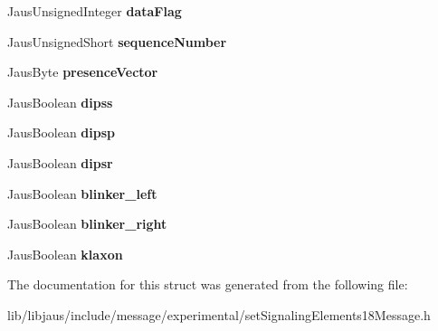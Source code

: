 \begin{DoxyCompactItemize}
\item 
\hypertarget{struct_set_signaling_elements18_message_struct_a64f7f558684c4d1894be82c2c8ef9be9}{\-Jaus\-Unsigned\-Integer {\bfseries data\-Flag}}\label{struct_set_signaling_elements18_message_struct_a64f7f558684c4d1894be82c2c8ef9be9}

\item 
\hypertarget{struct_set_signaling_elements18_message_struct_af2b609b366d6d6f5ca0ddd292bac9562}{\-Jaus\-Unsigned\-Short {\bfseries sequence\-Number}}\label{struct_set_signaling_elements18_message_struct_af2b609b366d6d6f5ca0ddd292bac9562}

\item 
\hypertarget{struct_set_signaling_elements18_message_struct_af1d24406f69c503790c1b650442d1dd6}{\-Jaus\-Byte {\bfseries presence\-Vector}}\label{struct_set_signaling_elements18_message_struct_af1d24406f69c503790c1b650442d1dd6}

\item 
\hypertarget{struct_set_signaling_elements18_message_struct_a379c20145c726a1412d9d187b7795714}{\-Jaus\-Boolean {\bfseries dipss}}\label{struct_set_signaling_elements18_message_struct_a379c20145c726a1412d9d187b7795714}

\item 
\hypertarget{struct_set_signaling_elements18_message_struct_aeb9d0eb5b73c14095748ceb5c5666f85}{\-Jaus\-Boolean {\bfseries dipsp}}\label{struct_set_signaling_elements18_message_struct_aeb9d0eb5b73c14095748ceb5c5666f85}

\item 
\hypertarget{struct_set_signaling_elements18_message_struct_aa7a2a0bbb2fc95c17983f4bbc91f3f6b}{\-Jaus\-Boolean {\bfseries dipsr}}\label{struct_set_signaling_elements18_message_struct_aa7a2a0bbb2fc95c17983f4bbc91f3f6b}

\item 
\hypertarget{struct_set_signaling_elements18_message_struct_a00214e806c9a2b9c520834dea7c606c7}{\-Jaus\-Boolean {\bfseries blinker\-\_\-left}}\label{struct_set_signaling_elements18_message_struct_a00214e806c9a2b9c520834dea7c606c7}

\item 
\hypertarget{struct_set_signaling_elements18_message_struct_a9785a4ba93da6470b1706f2f4d449052}{\-Jaus\-Boolean {\bfseries blinker\-\_\-right}}\label{struct_set_signaling_elements18_message_struct_a9785a4ba93da6470b1706f2f4d449052}

\item 
\hypertarget{struct_set_signaling_elements18_message_struct_afd298d6919d7e0f878a31875a78af4ca}{\-Jaus\-Boolean {\bfseries klaxon}}\label{struct_set_signaling_elements18_message_struct_afd298d6919d7e0f878a31875a78af4ca}

\end{DoxyCompactItemize}


\-The documentation for this struct was generated from the following file\-:\begin{DoxyCompactItemize}
\item 
lib/libjaus/include/message/experimental/set\-Signaling\-Elements18\-Message.\-h\end{DoxyCompactItemize}
